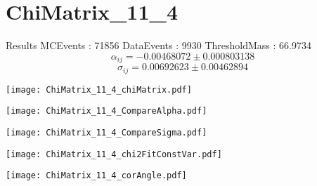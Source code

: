 \documentclass[a4paper,12pt]{article}
\begin{document}
\section{ChiMatrix\_11\_4}
\begin{minipage}{0.49\linewidth} Results \newline
MCEvents : 71856\newline
DataEvents : 9930 \newline
ThresholdMass : 66.9734\\
$$\alpha_{ij} = -0.00468072\pm 0.000803138$$
$$\sigma_{ij} = 0.00692623\pm 0.00462894$$
\end{minipage}\hfill
\begin{minipage}{0.49\linewidth} 
\texttt{[image: ChiMatrix\_11\_4\_chiMatrix.pdf]}\\
\end{minipage}
\hfill
\begin{minipage}{0.49\linewidth} 
\texttt{[image: ChiMatrix\_11\_4\_CompareAlpha.pdf]}\\
\end{minipage}
\hfill
\begin{minipage}{0.49\linewidth} 
\texttt{[image: ChiMatrix\_11\_4\_CompareSigma.pdf]}\\
\end{minipage}
\begin{minipage}{0.49\linewidth} 
\texttt{[image: ChiMatrix\_11\_4\_chi2FitConstVar.pdf]}\\
\end{minipage}
\hfill
\begin{minipage}{0.49\linewidth} 
\texttt{[image: ChiMatrix\_11\_4\_corAngle.pdf]}\\
\end{minipage}
\end{document}
